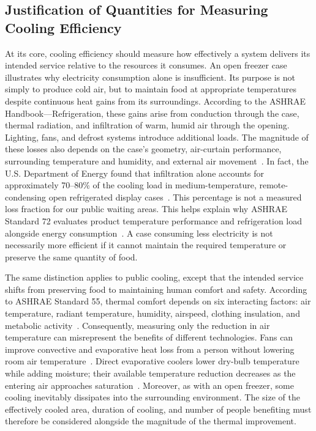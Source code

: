\vspace{8 pt}

\subsection{Justification of Quantities for Measuring Cooling Efficiency}
At its core, cooling efficiency should measure how effectively a system delivers its intended service relative to the resources it consumes. An open freezer case illustrates why electricity consumption alone is insufficient. Its purpose is not simply to produce cold air, but to maintain food at appropriate temperatures despite continuous heat gains from its surroundings. According to the ASHRAE Handbook—Refrigeration, these gains arise from conduction through the case, thermal radiation, and infiltration of warm, humid air through the opening. Lighting, fans, and defrost systems introduce additional loads. The magnitude of these losses also depends on the case's geometry, air-curtain performance, surrounding temperature and humidity, and external air movement~\cite{ashrae_refrigeration_2022}. In fact, the U.S. Department of Energy found that infiltration alone accounts for approximately 70–80\% of the cooling load in medium-temperature, remote-condensing open refrigerated display cases~\cite{doe_display_cases_2013}. This percentage is not a measured loss fraction for our public waiting areas. This helps explain why ASHRAE Standard 72 evaluates product temperature performance and refrigeration load alongside energy consumption~\cite{ashrae72_2022_scope}. A case consuming less electricity is not necessarily more efficient if it cannot maintain the required temperature or preserve the same quantity of food.

The same distinction applies to public cooling, except that the intended service shifts from preserving food to maintaining human comfort and safety. According to ASHRAE Standard 55, thermal comfort depends on six interacting factors: air temperature, radiant temperature, humidity, airspeed, clothing insulation, and metabolic activity~\cite{ashrae55_2023_scope}. Consequently, measuring only the reduction in air temperature can misrepresent the benefits of different technologies. Fans can improve convective and evaporative heat loss from a person without lowering room air temperature~\cite{cbe_fans_2023}. Direct evaporative coolers lower dry-bulb temperature while adding moisture; their available temperature reduction decreases as the entering air approaches saturation~\cite{pnnl_evaporative}. Moreover, as with an open freezer, some cooling inevitably dissipates into the surrounding environment. The size of the effectively cooled area, duration of cooling, and number of people benefiting must therefore be considered alongside the magnitude of the thermal improvement.

